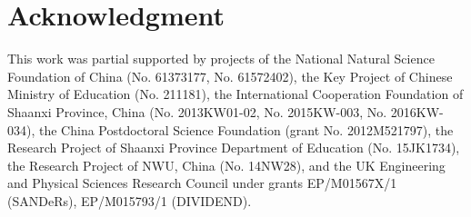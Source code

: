\documentclass[conference]{IEEEtran}
\begin{document}

\section*{Acknowledgment}
This work was partial supported by projects of the National Natural Science Foundation of China (No. 61373177, No. 61572402), the Key Project of Chinese Ministry of Education (No. 211181), the International Cooperation Foundation of Shaanxi Province, China (No. 2013KW01-02, No. 2015KW-003, No. 2016KW-034), the China Postdoctoral Science Foundation (grant No. 2012M521797), the Research Project of Shaanxi Province Department of Education (No. 15JK1734), the Research Project of NWU, China (No. 14NW28), and the UK Engineering and Physical Sciences Research Council under grants EP/M01567X/1 (SANDeRs), EP/M015793/1 (DIVIDEND).




%
%
%





\end{document}
